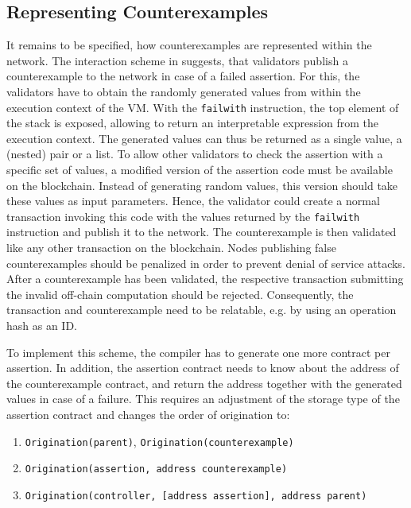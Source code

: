 \subsection{Representing Counterexamples}\label{sec:counterexample}
It remains to be specified, how counterexamples are represented within the network. The interaction scheme in  suggests, that validators publish a counterexample to the network in case of a failed assertion. For this, the validators have to obtain the randomly generated values from within the execution context of the VM. With the \texttt{failwith} instruction, the top element of the stack is exposed, allowing to return an interpretable expression from the execution context. The generated values can thus be returned as a single value, a (nested) pair or a list. To allow other validators to check the assertion with a specific set of values, a modified version of the assertion code must be available on the blockchain. Instead of generating random values, this version should take these values as input parameters. Hence, the validator could create a normal transaction invoking this code with the values returned by the \texttt{failwith} instruction and publish it to the network. The counterexample is then validated like any other transaction on the blockchain. Nodes publishing false counterexamples should be penalized in order to prevent denial of service attacks. After a counterexample has been validated, the respective transaction submitting the invalid off-chain computation should be rejected. Consequently, the transaction and counterexample need to be relatable, e.g. by using an operation hash as an ID. 

To implement this scheme, the compiler has to generate one more contract per assertion. In addition, the assertion contract needs to know about the address of the counterexample contract, and return the address together with the generated values in case of a failure. This requires an adjustment of the storage type of the assertion contract and changes the order of origination to:
\begin{enumerate}
\itemsep-0.5em
\item \texttt{Origination(parent)}, \texttt{Origination(counterexample)}
\item \texttt{Origination(assertion, address counterexample)}
\item \texttt{Origination(controller, [address assertion], address parent)} 
\end{enumerate}

